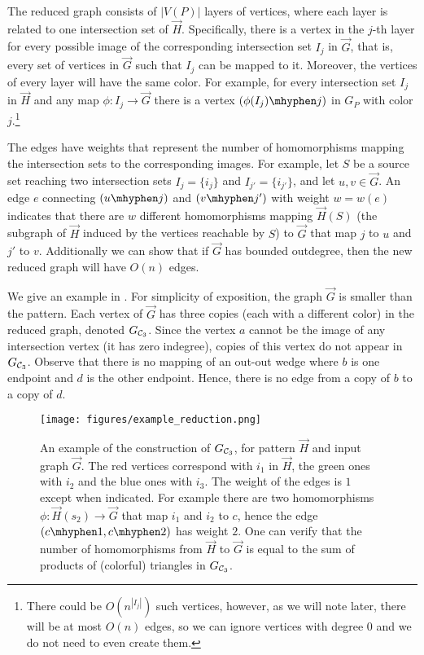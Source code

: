 \documentclass[a4paper,UKenglish,cleveref, autoref, numberwithinsect, thm-restate]{lipics-v2021}
\newcommand{\reduced}[1]{G_{#1}}
\newcommand{\cycle}[1]{\cC_{#1}}
\newcommand{\cC}{{\cal C}}
\begin{document}
	The reduced graph consists of $|V(P)|$ layers of vertices, where each layer is related to one intersection set of $\vec{H}$. Specifically, there is a vertex in the $j$-th layer for every possible image of the corresponding intersection set $I_j$ in $\vec{G}$, that is, every set of vertices in $\vec{G}$ such that $I_j$ can be mapped to it. Moreover, the vertices of every layer will have the same color. For example, for every intersection set $I_j$ in $\vec{H}$ and any map $\phi:I_j\to \vec{G}$ there is a vertex $(\phi(I_j) \mhyphen j)$ in $\reduced{P}$ with color $j$.\footnote{There could be $O(n^{|I_j|})$ such vertices, however, as we will note later, there will be at most $O(n)$ edges, so we can ignore vertices with degree $0$ and we do not need to even create them.}
	
	The edges have weights that represent the number of homomorphisms mapping the intersection sets to the corresponding images. For example, let $S$ be a source set reaching two intersection sets $I_j=\{i_j\}$ and $I_{j'}=\{i_{j'}\}$, and let $u,v \in \vec{G}$. An edge $e$ connecting $(u\mhyphen j)$ and $(v \mhyphen j')$ with weight $w=w(e)$ indicates that there are $w$ different homomorphisms mapping $\vec{H}(S)$ (the subgraph of $\vec{H}$ induced by the vertices reachable by $S$) to $\vec{G}$ that map $j$ to $u$ and $j'$ to $v$. Additionally we can show that if $\vec{G}$ has bounded outdegree, then the new reduced graph will have $O(n)$ edges.
	
	We give an example in . For simplicity of exposition, the graph $\vec{G}$ is smaller than the pattern. 
	Each vertex of $\vec{G}$ has three copies (each with a different color) in the reduced graph, denoted $G_{\cycle{3}}$. Since the vertex $a$ cannot be the image
	of any intersection vertex (it has zero indegree), copies of this vertex do not appear in $G_{\cycle{3}}$. Observe that there is no mapping of an out-out wedge 
	where $b$ is one endpoint and $d$ is the other endpoint. Hence, there is no edge from a copy of $b$ to a copy of $d$. 
	
	\begin{figure}
		\centering
		\texttt{[image: figures/example\_reduction.png]}\caption{An example of the construction of $\reduced{\cycle{3}}$, for pattern $\vec{H}$ and input graph $\vec{G}$. The red vertices correspond with $i_1$ in $\vec{H}$, the green ones with $i_2$ and the blue ones with $i_3$. The weight of the edges is $1$ except when indicated. For example there are two homomorphisms $\phi: \vec{H}(s_2) \to \vec{G}$ that map $i_1$ and $i_2$ to $c$, hence the edge $(c\mhyphen 1,c\mhyphen 2)$ has weight $2$. One can verify that the number of homomorphisms from $\vec{H}$ to $\vec{G}$ is equal to the sum of products of (colorful) triangles in $\reduced{\cycle{3}}$.}
		\label{fig:example_reduction}
	\end{figure}
	
\end{document}
